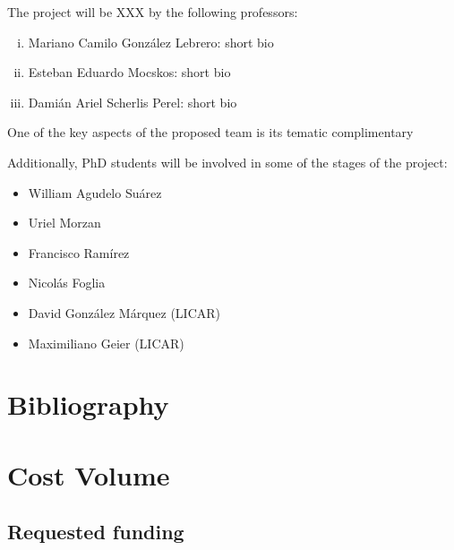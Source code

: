\documentclass[a4paper,10pt]{article}
\begin{document}
The project will be XXX  by the following professors:
\begin{enumerate}[i)]

\item Mariano Camilo Gonz\'alez Lebrero: short bio

\item Esteban Eduardo Mocskos: short bio

\item Dami\'an Ariel Scherlis Perel: short bio

\end{enumerate}

One of the key aspects of the proposed team is its tematic complimentary

Additionally, PhD students will be involved in some of the stages of the project:
\begin{itemize}
\item William Agudelo Su\'arez

\item Uriel Morzan

\item Francisco Ram\'irez

\item Nicol\'as Foglia

\item David Gonz\'alez M\'arquez (LICAR)

\item Maximiliano Geier (LICAR)

\end{itemize}


\newpage

\section{Bibliography}




\newpage

\section{Cost Volume}

\subsection{Requested funding}
\end{document}
